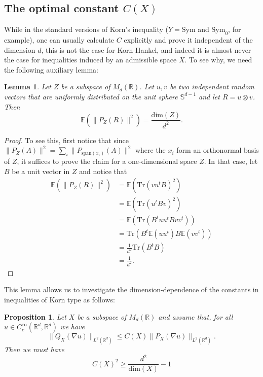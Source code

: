 \documentclass[11pt, a4paper, reqno]{elsarticle}
\newtheorem{proposition}{Proposition}[section]
\newtheorem{lemma}[theorem]{Lemma}
\theoremstyle{definition}
\theoremstyle{remark}
\begin{document}
\subsection{The optimal constant \texorpdfstring{$C(X)$}{C(X)}}
While in the standard versions of Korn's 
inequality ($Y=\text{Sym}$ and $\text{Sym}_0$, for example),
one can usually calculate $C$ explicitly and prove
it independent of the dimension $d$, this is not the
case for Korn-Hankel, and indeed it is almost never the case
for inequalities induced by an admissible space $X$.
To see why, we need the following auxiliary lemma:
\begin{lemma}
Let $Z$ be a subspace of $M_d(\mathbb{R})$. Let $u,v$
be two independent random vectors that
 are uniformly distributed on 
 the unit sphere $\mathbb{S}^{d-1}$
and let $R=u\otimes v$. Then
\begin{equation*}
    \mathbb E(\|P_Z(R)\|^2)=\frac{\mathrm{dim}(Z)}{d^2}.
\end{equation*}
\end{lemma}
\begin{proof}
To see this, first notice that since
$
	\|P_Z(A)\|^2
=
	\sum_i \|P_{\mathrm{span}(x_i)}(A)\|^2
$
where the $x_i$ form an orthonormal basis of $Z$,
it suffices to prove the claim for a one-dimensional
space $Z$.
In that case, let $B$ be a unit vector in $Z$ and notice that
\begin{align*}
    \mathbb E(\|P_Z(R)\|^2)&=
     \mathbb E\left(\mathrm{Tr}(vu^tB)^2\right)
    \\&
    =
    \mathbb E(\mathrm{Tr}(u^t B v)^2)
    \\&
    =
    \mathbb E(\mathrm{Tr}(B^t uu^t B vv^t))
    \\&
    =
     \mathrm {Tr}(B^t\mathbb E(uu^t)B \mathbb E(vv^t))
    \\&
    =
   \frac1{d^2}  \mathrm{Tr}(B^tB)
    \\&
    =
    \frac1{d^2}.
\end{align*}
\end{proof}
This lemma allows us to investigate the dimension-dependence
of the constants in inequalities of Korn type as follows:
\begin{proposition}\label{prop : trivupperbound}
    Let $X$ be a subspace of $M_d(\mathbb{R})$
    and assume that, for all $u\in C^\infty_c(\mathbb{R}^d,\mathbb{R}^d)$
    we have
    \begin{equation*}
        \|Q_X(\nabla u)\|_{L^2(\mathbb{R}^d)}\le C(X) \|P_X(\nabla u)\|_{L^2(\mathbb{R}^d)}.
    \end{equation*}
    Then we must have
    \begin{equation*}
        C(X)^2\ge \frac{d^2}{\mathrm{dim}(X)}-1
    \end{equation*}
\end{proposition}
\end{document}

